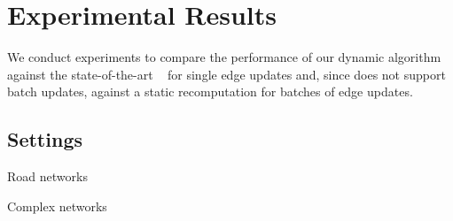 \section{Experimental Results}
\label{sec:dyn-mwm:experiments}
%
We conduct experiments to compare the performance of our dynamic \suitor
algorithm against the state-of-the-art
\dynmwmrandom~\cite{conf/acda/AngrimanMSU21} for single edge updates and, since
\dynmwmrandom does not support batch updates, against a static recomputation
for batches of edge updates.

%
%


\subsection{Settings}
%
\begin{table}[tb]
\centering\footnotesize
\setlength{\tabcolsep}{2pt}
\label{tab:dyn-mwm:real-world-insts}

\begin{subtable}[t]{.5\textwidth}
\centering
\caption{Road networks}

\end{subtable}\hfill
\begin{subtable}[t]{.5\textwidth}
\centering
\caption{Complex networks}

\end{subtable}
\end{table}

